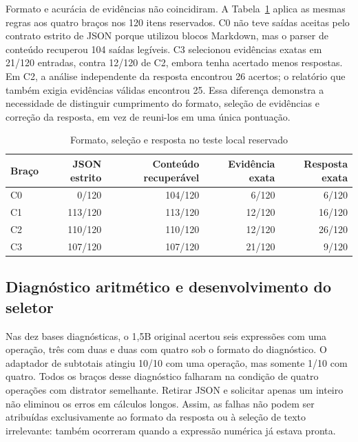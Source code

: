 \documentclass[12pt,a4paper]{article}
\begin{document}
Formato e acurácia de evidências não coincidiram. A Tabela~\ref{tab:format} aplica as mesmas regras aos quatro braços nos 120 itens reservados. C0 não teve saídas aceitas pelo contrato estrito de JSON porque utilizou blocos Markdown, mas o parser de conteúdo recuperou 104 saídas legíveis. C3 selecionou evidências exatas em 21/120 entradas, contra 12/120 de C2, embora tenha acertado menos respostas. Em C2, a análise independente da resposta encontrou 26 acertos; o relatório que também exigia evidências válidas encontrou 25. Essa diferença demonstra a necessidade de distinguir cumprimento do formato, seleção de evidências e correção da resposta, em vez de reuni-los em uma única pontuação.

\begin{table}[htbp]\centering\caption{Formato, seleção e resposta no teste local reservado}\label{tab:format}\begin{tabular}{lrrrr}\toprule Braço & JSON estrito & Conteúdo recuperável & Evidência exata & Resposta exata \\\midrule C0 & 0/120 & 104/120 & 6/120 & 6/120 \\ C1 & 113/120 & 113/120 & 12/120 & 16/120 \\ C2 & 110/120 & 110/120 & 12/120 & 26/120 \\ C3 & 107/120 & 107/120 & 21/120 & 9/120 \\\bottomrule\end{tabular}\par{}\end{table}

\subsection{Diagnóstico aritmético e desenvolvimento do seletor}
Nas dez bases diagnósticas, o 1,5B original acertou seis expressões com uma operação, três com duas e duas com quatro sob o formato do diagnóstico. O adaptador de subtotais atingiu 10/10 com uma operação, mas somente 1/10 com quatro. Todos os braços desse diagnóstico falharam na condição de quatro operações com distrator semelhante. Retirar JSON e solicitar apenas um inteiro não eliminou os erros em cálculos longos. Assim, as falhas não podem ser atribuídas exclusivamente ao formato da resposta ou à seleção de texto irrelevante: também ocorreram quando a expressão numérica já estava pronta.
\end{document}
